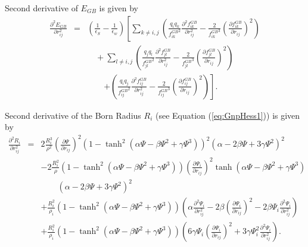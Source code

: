 \documentclass[12pt]{article}
\begin{document}
Second derivative of $E_{GB}$ is given by
\begin{eqnarray}
\frac{\partial^{2} E_{GB}}{\partial r_{ij}^{2}} &=&  \left(\frac{1}{{\epsilon}_{S}} - \frac{1}{{\epsilon}_{w}}\right)
\left[ 
\displaystyle\sum_{k\ne i,j} \left(\frac{q_{i}q_{k}}{{f_{ik}^{GB}}^{2}}\frac{\partial^{2}f_{ik}^{GB}}{\partial r_{ij}^{2}} - \frac{2}{{f_{ik}^{GB}}^{3}}\left(\frac{\partial f_{ik}^{GB}}{\partial r_{ij}}\right)^{2}\right)\right. \nonumber \\
&& \quad + \displaystyle\sum_{l\ne i,j} \left(\frac{q_{j}q_{l}}{{f_{jl}^{GB}}^{2}}\frac{\partial^{2}f_{jl}^{GB}}{\partial r_{ij}^{2}} - \frac{2}{{f_{jl}^{GB}}^{3}}\left(\frac{\partial f_{jl}^{GB}}{\partial r_{ij}}\right)^{2}\right) \nonumber \\
&& \qquad \left. +\left(\frac{q_{i}q_{j}}{{f_{ij}^{GB}}^{2}}\frac{\partial^{2}f_{ij}^{GB}}{\partial r_{ij}^{2}} - \frac{2}{{f_{ij}^{GB}}^{3}}\left(\frac{\partial f_{ij}^{GB}}{\partial r_{ij}}\right)^{2} \right) 
\right].
\end{eqnarray}

Second derivative of the Born Radius $R_{i}$ (see Equation (\ref{eq:GnpHess1})) is given by
\begin{eqnarray}
\frac{\partial^{2}R_{i}}{\partial r_{ij}^{2}} & = & 2\frac{R_{i}^{3}}{\rho^{2}}\left(\frac{\partial {\Psi}}{\partial r_{ij}}\right)^{2}(1 - \tanh^{2}({\alpha}{\Psi} - {\beta}{\Psi}^{2} + {\gamma}{\Psi}^{3}))^{2}({\alpha} - 2{\beta}{\Psi} + 3{\gamma}{\Psi}^{2})^{2}  \nonumber \\
& & - 2\frac{R_{i}^{2}}{\rho}(1 -{\tanh^{2}({\alpha}{\Psi} - {\beta}{\Psi}^{2} + {\gamma}{\Psi}^{3})}) \left(\frac{\partial {\Psi}_{i}}{\partial r_{ij}}\right)^{2} \tanh({\alpha}{\Psi} - {\beta}{\Psi}^{2} + {\gamma}{\Psi}^{3})  \nonumber \\
& &\qquad ({\alpha} - 2{\beta}{\Psi} + 3{\gamma}{\Psi}^{2})^{2}   \nonumber\\
& & +\frac{R_{i}^{2}}{{\rho}_{i}}(1 - \tanh^{2}({\alpha}{\Psi} - {\beta}{\Psi}^{2} + {\gamma}{\Psi}^{3}))\left({\alpha}\frac{\partial^{2}{\Psi}_{i}}{\partial r_{ij}^{2}} - 2{\beta}\left(\frac{\partial {\Psi}_{i}}{\partial r_{ij}}\right)^{2} - 2{\beta}{\Psi}_{i}\frac{\partial^{2}{\Psi}_{i}}{\partial r_{ij}^{2}}\right)  \nonumber \\
& & +\frac{R_{i}^{2}}{{\rho}_{i}}(1 - \tanh^{2}({\alpha}{\Psi} - {\beta}{\Psi}^{2} + {\gamma}{\Psi}^{3}))\left( 6{\gamma}{\Psi}_{i}\left(\frac{\partial {\Psi}_{i}}{\partial r_{ij}}\right)^{2} + 3{\gamma}{\Psi}_{i}^{2}\frac{\partial^{2}{\Psi}_{i}}{\partial r_{ij}^{2}}\right).
\end{eqnarray}
\end{document}
